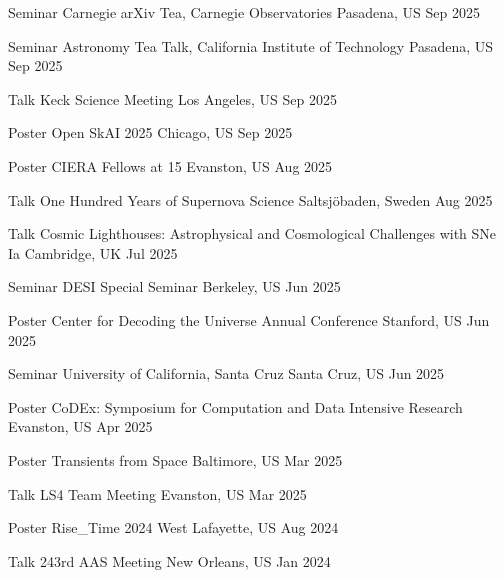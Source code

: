 


\begin{cventries}
	
	\cvsimsimpentry
	{Seminar}
	{Carnegie arXiv Tea, Carnegie Observatories}
	{Pasadena, US}
	{Sep 2025}

	\cvsimsimpentry
	{Seminar}
	{Astronomy Tea Talk, California Institute of Technology}
	{Pasadena, US}
	{Sep 2025}

	\cvsimsimpentry
	{Talk}
	{Keck Science Meeting}
	{Los Angeles, US}
	{Sep 2025}

	\cvsimsimpentry
	{Poster}
	{Open SkAI 2025}
	{Chicago, US}
	{Sep 2025}

	\cvsimsimpentry
	{Poster}
	{CIERA Fellows at 15}
	{Evanston, US}
	{Aug 2025}

	\cvsimsimpentry
	{Talk}
	{One Hundred Years of Supernova Science}
	{Saltsjöbaden, Sweden}
	{Aug 2025}

	\cvsimsimpentry
	{Talk}
	{Cosmic Lighthouses: Astrophysical and Cosmological Challenges with SNe Ia}
	{Cambridge, UK}
	{Jul 2025}

	\cvsimsimpentry
	{Seminar}
	{DESI Special Seminar}
	{Berkeley, US}
	{Jun 2025}

	\cvsimsimpentry
	{Poster}
	{Center for Decoding the Universe Annual Conference}
	{Stanford, US}
	{Jun 2025}

	\cvsimsimpentry
	{Seminar}
	{University of California, Santa Cruz}
	{Santa Cruz, US}
	{Jun 2025}

	\cvsimsimpentry
	{Poster}
	{CoDEx: Symposium for Computation and Data Intensive Research}
	{Evanston, US}
	{Apr 2025}

	\cvsimsimpentry
	{Poster}
	{Transients from Space}
	{Baltimore, US}
	{Mar 2025}

	\cvsimsimpentry
	{Talk}
	{LS4 Team Meeting}
	{Evanston, US}
	{Mar 2025}

	\cvsimsimpentry
	{Poster}
	{Rise\_Time 2024}
	{West Lafayette, US}
	{Aug 2024}

	\cvsimsimpentry
	{Talk}
	{243rd AAS Meeting}
	{New Orleans, US}
	{Jan 2024}


\end{cventries}
